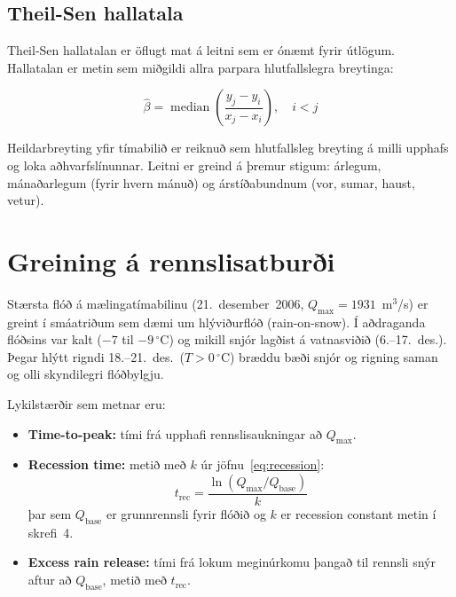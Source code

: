 \documentclass[12pt, a4paper]{article}
\begin{document}
\subsection{Theil-Sen hallatala}

Theil-Sen hallatalan \cite{Sen1968, Theil1950} er öflugt mat á leitni sem er
ónæmt fyrir útlögum. Hallatalan er metin sem miðgildi allra parpara
hlutfallslegra breytinga:

\begin{equation}
    \hat{\beta} = \operatorname{median}\!\left(\frac{y_j - y_i}{x_j - x_i}
    \right), \quad i < j
    \label{eq:theil-sen}
\end{equation}

Heildarbreyting yfir tímabilið er reiknuð sem hlutfallsleg breyting á milli
upphafs og loka aðhvarfslínunnar. Leitni er greind á þremur stigum: árlegum,
mánaðarlegum (fyrir hvern mánuð) og árstíðabundnum (vor, sumar, haust, vetur).

\section{Greining á rennslisatburði}

Stærsta flóð á mælingatímabilinu (21.~desember~2006,
$Q_{\max} = 1931$~m$^3$/s) er greint í smáatriðum sem dæmi um
hlýviðurflóð (rain-on-snow). Í aðdraganda flóðsins var kalt ($-7$ til
$-9\,^\circ$C) og mikill snjór lagðist á vatnasviðið (6.--17.~des.).
Þegar hlýtt rigndi 18.--21.~des.\ ($T > 0\,^\circ$C) bræddu bæði snjór
og rigning saman og olli skyndilegri flóðbylgju.

Lykilstærðir sem metnar eru:

\begin{itemize}
    \item \textbf{Time-to-peak:} tími frá upphafi rennslisaukningar að
    $Q_{\max}$.

    \item \textbf{Recession time:} metið með $k$ úr jöfnu~\eqref{eq:recession}:
    \begin{equation}
        t_{\mathrm{rec}} = \frac{\ln(Q_{\max}/Q_{\mathrm{base}})}{k}
        \label{eq:recession-time}
    \end{equation}
    þar sem $Q_{\mathrm{base}}$ er grunnrennsli fyrir flóðið og $k$ er
    recession constant metin í skrefi~4.

    \item \textbf{Excess rain release:} tími frá lokum meginúrkomu þangað
    til rennsli snýr aftur að $Q_{\mathrm{base}}$, metið með
    $t_{\mathrm{rec}}$.
\end{itemize}
\end{document}
